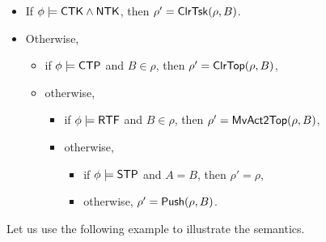 \begin{itemize}
	\item If $\phi\models{\sf CTK}\wedge{\sf NTK}$, then $\rho' = \mathsf{ClrTsk}(\rho, B)$.
	\item Otherwise,
	\begin{itemize}
		\item if $\phi \models{\sf CTP}$ and $B \in \rho$, then $\rho' =\mathsf{ClrTop}(\rho, B)$,
		\item otherwise,
		\begin{itemize}
			\item if $\phi \models {\sf RTF}$ and $B \in \rho$, then $\rho'=\mathsf{MvAct2Top}(\rho, B)$,
			\item otherwise,
			\begin{itemize}
				\item if $\phi \models {\sf STP}$ and $A = B$, then $\rho' = \rho$,
				\item otherwise, $\rho' = \mathsf{Push}(\rho, B)$.
			\end{itemize}
		\end{itemize}
	\end{itemize}
\end{itemize}
Let us use the following example to illustrate the semantics.
